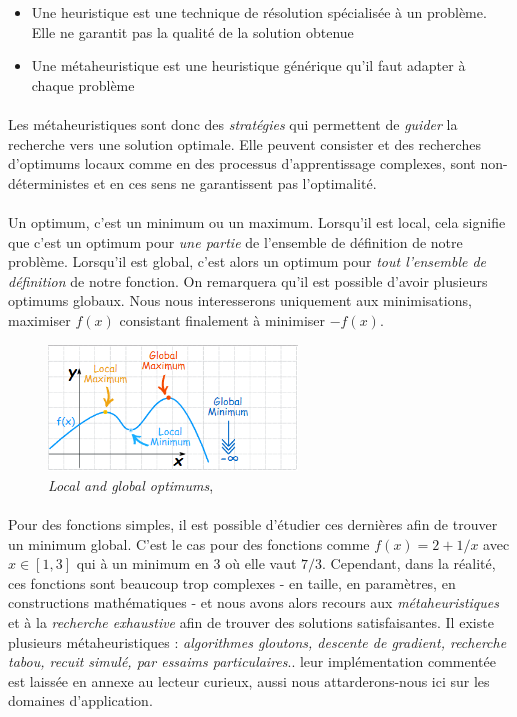 \begin{itemize}
    \item Une heuristique est une technique de résolution spécialisée à un problème. Elle ne garantit pas la qualité de
    la solution obtenue
    \item Une métaheuristique est une heuristique générique qu’il faut adapter à chaque problème
\end{itemize}

\paragraph{} Les métaheuristiques sont donc des \emph{stratégies} qui permettent de \emph{guider} la recherche vers une
solution optimale. Elle peuvent consister et des recherches d'optimums locaux comme en des processus d'apprentissage complexes,
sont non-déterministes et en ces sens ne garantissent pas l'optimalité.

\paragraph{} Un optimum, c'est un minimum ou un maximum. Lorsqu'il est local, cela signifie que c'est un optimum pour \emph{une
partie} de l'ensemble de définition de notre problème. Lorsqu'il est global, c'est alors un optimum pour \emph{tout l'ensemble
de définition} de notre fonction. On remarquera qu'il est possible d'avoir plusieurs optimums globaux. Nous nous interesserons 
uniquement aux minimisations, maximiser $f(x)$ consistant finalement à minimiser $-f(x)$.

\begin{figure}[h]
    \centering
    \includegraphics[width=250px]{chapters/03/images/optimums.png}
    \caption{\label{optimums}\emph{Local and global optimums}, \cite{Optimums0}}
\end{figure}

\paragraph{} Pour des fonctions simples, il est possible d'étudier ces dernières afin de trouver un minimum global.
C'est le cas pour des fonctions comme $f(x) = 2 + 1/x$ avec $x \in [1, 3]$ qui à un minimum en 3 où elle vaut $7/3$.
Cependant, dans la réalité, ces fonctions sont beaucoup trop complexes - en taille, en paramètres, en constructions
mathématiques - et nous avons alors recours aux \emph{métaheuristiques} et à la \emph{recherche exhaustive} afin
de trouver des solutions satisfaisantes. Il existe plusieurs métaheuristiques : \emph{algorithmes gloutons, descente
de gradient, recherche tabou, recuit simulé, par essaims particulaires}.. leur implémentation commentée est laissée
en annexe au lecteur curieux, aussi nous attarderons-nous ici sur les domaines d'application.

